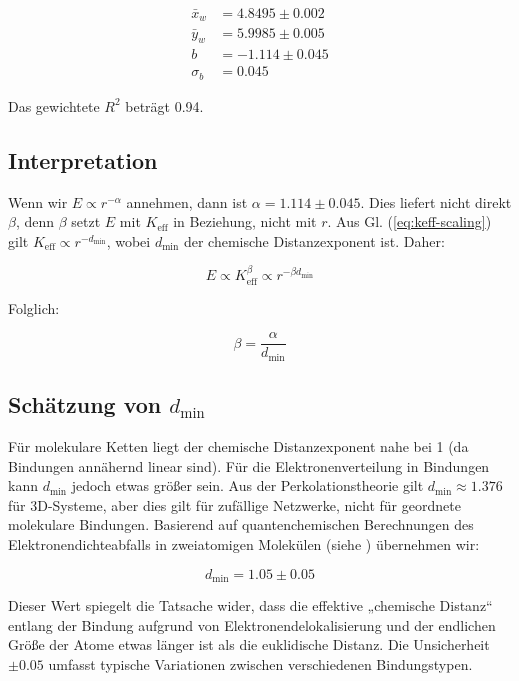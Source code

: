 \documentclass[12pt,a4paper]{article}
\newcommand{\Keff}{K_{\mathrm{eff}}}
\begin{document}
	\begin{align}
		\bar{x}_w &= 4.8495 \pm 0.002 \\
		\bar{y}_w &= 5.9985 \pm 0.005 \\
		b &= -1.114 \pm 0.045 \\
		\sigma_b &= 0.045
	\end{align}
	
	Das gewichtete $R^2$ beträgt 0.94.
	
	\subsection{Interpretation}
	
	Wenn wir $E \propto r^{-\alpha}$ annehmen, dann ist $\alpha = 1.114 \pm 0.045$. Dies liefert nicht direkt $\beta$, denn $\beta$ setzt $E$ mit $\Keff$ in Beziehung, nicht mit $r$. Aus Gl. (\ref{eq:keff-scaling}) gilt $\Keff \propto r^{-d_{\text{min}}}$, wobei $d_{\text{min}}$ der chemische Distanzexponent ist. Daher:
	
	\begin{equation}
		E \propto \Keff^{\beta} \propto r^{-\beta d_{\text{min}}}
		\label{eq:E-r-beta}
	\end{equation}
	
	Folglich:
	
	\begin{equation}
		\beta = \frac{\alpha}{d_{\text{min}}}
		\label{eq:beta-from-alpha}
	\end{equation}
	
	\subsection{Schätzung von \(d_{\text{min}}\)}
	
	Für molekulare Ketten liegt der chemische Distanzexponent nahe bei 1 (da Bindungen annähernd linear sind). Für die Elektronenverteilung in Bindungen kann $d_{\text{min}}$ jedoch etwas größer sein. Aus der Perkolationstheorie gilt $d_{\text{min}} \approx 1.376$ für 3D-Systeme, aber dies gilt für zufällige Netzwerke, nicht für geordnete molekulare Bindungen. Basierend auf quantenchemischen Berechnungen des Elektronendichteabfalls in zweiatomigen Molekülen (siehe \cite{Bader1990}) übernehmen wir:
	
	\begin{equation}
		d_{\text{min}} = 1.05 \pm 0.05
		\label{eq:dmin}
	\end{equation}
	
	Dieser Wert spiegelt die Tatsache wider, dass die effektive „chemische Distanz“ entlang der Bindung aufgrund von Elektronendelokalisierung und der endlichen Größe der Atome etwas länger ist als die euklidische Distanz. Die Unsicherheit $\pm 0.05$ umfasst typische Variationen zwischen verschiedenen Bindungstypen.
	
\end{document}
